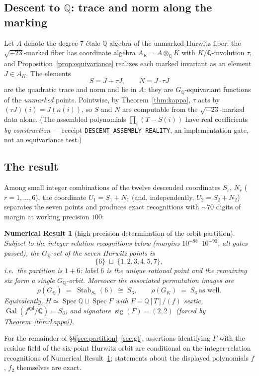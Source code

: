 \documentclass[11pt]{amsart}
\newcommand{\QQ}{\mathbb{Q}}
\newcommand{\GQ}{G_{\QQ}}
\newcommand{\GK}{G_{K}}
\newcommand{\sqm}{\sqrt{-23}}
\newcommand{\kap}{\kappa}
\theoremstyle{plain}
\newtheorem{numresult}[theorem]{Numerical Result}
\theoremstyle{definition}
\begin{document}
\subsection*{Descent to $\QQ$: trace and norm along the marking}
Let $A$ denote the degree-$7$ \'etale $\QQ$-algebra of the unmarked
Hurwitz fiber; the $\sqm$-marked fiber has coordinate algebra
$A_K=A\otimes_\QQ K$ with $K/\QQ$-involution $\tau$, and
Proposition~\ref{prop:equivariance} realizes each marked invariant as
an element $J\in A_K$. The elements
\[
  S=J+\tau J,\qquad N=J\cdot\tau J
\]
are the quadratic trace and norm and lie in $A$: they are
$\GQ$-equivariant functions of the \emph{unmarked} points. Pointwise,
by Theorem~\ref{thm:kappa}, $\tau$ acts by
$(\tau J)(i)=\overline{J(\kap(i))}$, so $S$ and $N$ are computable
from the $\sqm$-marked data alone. (The assembled polynomials
$\prod_i(T-S(i))$ have real coefficients \emph{by construction} ---
receipt \texttt{DESCENT\_ASSEMBLY\_REALITY}, an implementation gate,
not an equivariance test.)

\subsection*{The result}
Among small integer combinations of the twelve descended coordinates
$S_r$, $N_r$ ($r=1,\dots,6$), the coordinate $U_1=S_1+N_1$ (and,
independently, $U_2=S_2+N_2$) separates the seven points and
produces exact recognitions with $\sim70$ digits of margin at working
precision $100$:

\begin{numresult}[high-precision determination of the orbit partition]
\label{thm:partition}
Subject to the integer-relation recognitions below (margins
$10^{-88}$--$10^{-90}$, all gates passed), the $\GQ$-set of the seven
Hurwitz points is
\[
  \{6\}\;\sqcup\;\{1,2,3,4,5,7\},
\]
i.e.\ the partition is $1+6$: label $6$ is the unique rational point
and the remaining six form a single $\GQ$-orbit. Moreover the
associated permutation images are
\[
  \rho(\GQ)\;=\;\operatorname{Stab}_{S_7}(6)\;\cong\;S_6,
  \qquad
  \rho(\GK)\;=\;S_6 \ \text{as well.}
\]
Equivalently, $H\simeq\operatorname{Spec}\QQ\sqcup\operatorname{Spec}F$
with $F=\QQ[T]/(f)$ sextic, $\operatorname{Gal}(f^{\mathrm{spl}}/\QQ)
= S_6$, and signature $\operatorname{sig}(F)=(2,2)$ \textup{(}forced
by Theorem~\ref{thm:kappa}\textup{)}.
\end{numresult}

For the remainder of \S\S\ref{sec:partition}--\ref{sec:gt},
assertions identifying $F$ with the residue field of the six-point
Hurwitz orbit are conditional on the integer-relation recognitions
of Numerical Result~\ref{thm:partition}; statements about the
displayed polynomials $f$, $f_2$ themselves are exact.
\end{document}

